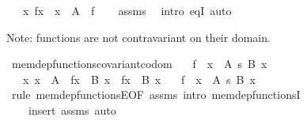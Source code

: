 \begin{isabellebody}
\ \ \ {\isachardoublequoteopen}{\isacharbraceleft}{\kern0pt}{\isasymlangle}x{\isacharcomma}{\kern0pt}\ f{\isacharbackquote}{\kern0pt}x{\isasymrangle}\ {\isacharbar}{\kern0pt}\ x\ {\isasymin}\ A{\isacharbraceright}{\kern0pt}\ {\isacharequal}{\kern0pt}\ f{\isachardoublequoteclose}\isanewline
%
\isadelimproof
\ \ %
\endisadelimproof
%
\isatagproof
{}\isamarkupfalse%
\ assms\ \isamarkupfalse%
\ {\isacharparenleft}{\kern0pt}intro\ eqI{\isacharparenright}{\kern0pt}\ auto%
\endisatagproof
{\isafoldproof}%
%
\isadelimproof
%
\endisadelimproof
%
\begin{isamarkuptext}%
Note: functions are not contravariant on their domain.%
\end{isamarkuptext}\isamarkuptrue%
\isamarkupfalse%
\ mem{\isacharunderscore}{\kern0pt}dep{\isacharunderscore}{\kern0pt}functions{\isacharunderscore}{\kern0pt}covariant{\isacharunderscore}{\kern0pt}codom{\isacharcolon}{\kern0pt}\isanewline
\ \ \ {\isachardoublequoteopen}f\ {\isasymin}\ {\isacharparenleft}{\kern0pt}x\ {\isasymin}\ A{\isacharparenright}{\kern0pt}\ {\isasymrightarrow}s\ {\isacharparenleft}{\kern0pt}B\ x{\isacharparenright}{\kern0pt}{\isachardoublequoteclose}\isanewline
\ \ \ {\isachardoublequoteopen}{\isasymAnd}x{\isachardot}{\kern0pt}\ x\ {\isasymin}\ A\ {\isasymLongrightarrow}\ f{\isacharbackquote}{\kern0pt}x\ {\isasymin}\ B\ x\ {\isasymLongrightarrow}\ f{\isacharbackquote}{\kern0pt}x\ {\isasymin}\ B{\isacharprime}{\kern0pt}\ x{\isachardoublequoteclose}\isanewline
\ \ \ {\isachardoublequoteopen}f\ {\isasymin}\ {\isacharparenleft}{\kern0pt}x\ {\isasymin}\ A{\isacharparenright}{\kern0pt}\ {\isasymrightarrow}s\ {\isacharparenleft}{\kern0pt}B{\isacharprime}{\kern0pt}\ x{\isacharparenright}{\kern0pt}{\isachardoublequoteclose}\isanewline
%
\isadelimproof
\ \ %
\endisadelimproof
%
\isatagproof
{}\isamarkupfalse%
\ {\isacharparenleft}{\kern0pt}rule\ mem{\isacharunderscore}{\kern0pt}dep{\isacharunderscore}{\kern0pt}functionsE{\isacharbrackleft}{\kern0pt}OF\ assms{\isacharparenleft}{\kern0pt}{}{\isacharparenright}{\kern0pt}{\isacharbrackright}{\kern0pt}{\isacharcomma}{\kern0pt}\ intro\ mem{\isacharunderscore}{\kern0pt}dep{\isacharunderscore}{\kern0pt}functionsI{\isacharparenright}{\kern0pt}\isanewline
\ \ \ \ {\isacharparenleft}{\kern0pt}insert\ assms{\isacharcomma}{\kern0pt}\ auto{\isacharparenright}{\kern0pt}%
\endisatagproof
{\isafoldproof}%
%
\isadelimproof
\isanewline
%
\endisadelimproof
\isanewline
{}\isamarkupfalse%

\end{isabellebody}

